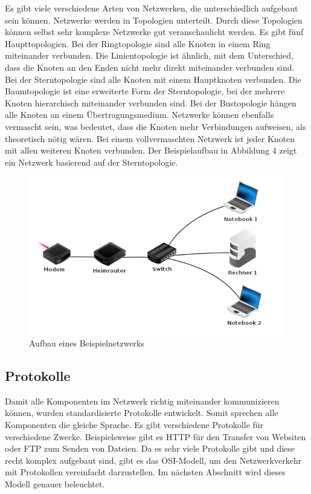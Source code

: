 \documentclass[12pt]{article}
\begin{document}
Es gibt viele verschiedene Arten von Netzwerken, die unterschiedlich aufgebaut  sein können. Netzwerke werden in Topologien unterteilt. Durch diese Topologien können selbst sehr komplexe Netzwerke gut veranschaulicht werden. Es gibt fünf Haupttopologien. Bei der Ringtopologie sind alle Knoten in einem Ring miteinander verbunden. Die Linientopologie ist ähnlich, mit dem Unterschied, dass die Knoten an den Enden nicht mehr direkt miteinander verbunden sind. Bei der Sterntopologie sind alle Knoten mit einem Hauptknoten verbunden. Die Baumtopologie ist eine erweiterte Form der Sterntopologie, bei der mehrere Knoten hierarchisch miteinander verbunden sind. Bei der Bustopologie hängen alle Knoten an einem Übertragungsmedium. Netzwerke können ebenfalls vermascht sein, was bedeutet, dass die Knoten mehr Verbindungen aufweisen, als theoretisch nötig wären. Bei einem vollvermaschten Netzwerk ist jeder Knoten mit allen weiteren Knoten verbunden.\cite{topologien-kurthelec} Der Beispielaufbau in Abbildung 4 zeigt ein Netzwerk basierend auf der Sterntopologie.

\begin{figure}[h]
	\centering
	\includegraphics[scale=0.7]{Bilder/beispielnetzwerk}
	\caption{Aufbau eines Beispielnetzwerks \cite{network-self}}
	\label{fig:figure4}
\end{figure}






\subsection{Protokolle}

Damit alle Komponenten im Netzwerk richtig miteinander kommunizieren können, wurden standardisierte Protokolle entwickelt. Somit  sprechen alle Komponenten \glq die gleiche Sprache\grq. Es gibt verschiedene Protokolle für verschiedene Zwecke. Beispielsweise gibt es HTTP für den Transfer von Websiten oder FTP zum Senden von Dateien. Da es sehr viele Protokolle gibt und diese recht komplex aufgebaut sind, gibt es das OSI-Modell, um den Netzwerkverkehr mit Protokollen vereinfacht darzustellen. Im nächsten Abschnitt wird dieses Modell genauer beleuchtet.
\end{document}
